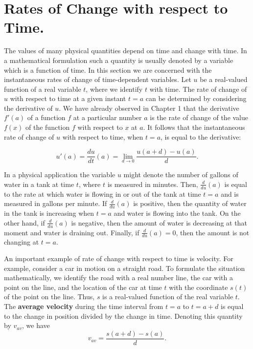\section{Rates of Change with respect to Time.}\label{sec 2.3}
The values of many physical quantities depend on time and change with time. In a mathematical formulation such a quantity is usually denoted by a variable which is a function of time. In this section we are concerned with the instantaneous rates of change of time-dependent variables. Let $u$ be a real-valued function of a real variable $t$, where we identify $t$ with time. The rate of change of $u$ with respect to time at a given instant $t = a$ can be determined by considering the derivative of $u$. We have already observed in Chapter 1 that the derivative $f'(a)$ of a function $f$ at a particular number $a$ is the rate of change of the value $f(x)$ of the function $f$ with respect to $x$ at $a$. It follows that the instantaneous rate of change of $u$ with respect to time, when $t = a$, is equal to the derivative:

$$
u'(a) = \frac{du}{dt} (a) = \lim_{d \rightarrow 0}\frac{u(a + d) - u(a)}{d}.
$$

In a physical application the variable $u$ might denote the number of gallons of water in a tank at time $t$, where $t$ is measured in minutes. Then, $\frac{d}{du}(a)$ is equal to the rate at which water is flowing in or out of the tank at time $t = a$ and is measured in gallons per minute. If $\frac{d}{du}(a)$ is positive, then the quantity of water in the tank is increasing when $t = a$ and water is flowing into the tank. On the other hand, if $\frac{d}{du}(a)$ is negative, then the amount of water is decreasing at that moment and water is draining out. Finally, if $\frac{d}{du}(a) = 0$, then the amount is not changing
at $t = a$.

An important example of rate of change with respect to time is velocity. For example, consider a car in motion on a straight road. To formulate the situation mathematically, we identify the road with a real number line, the car with a point on the line, and the location of the car at time $t$ with the coordinate $s(t)$ of the point on the line. Thus, $s$ is a real-valued function of
the real variable $t$. The \textbf{average velocity} during the time interval from $t = a$ to $t = a + d$ is equal to the change in position divided by the change in time. Denoting this quantity by $v_{av}$, we have
$$
v_{av} = \frac{s(a + d) - s(a)}{d}.
$$

